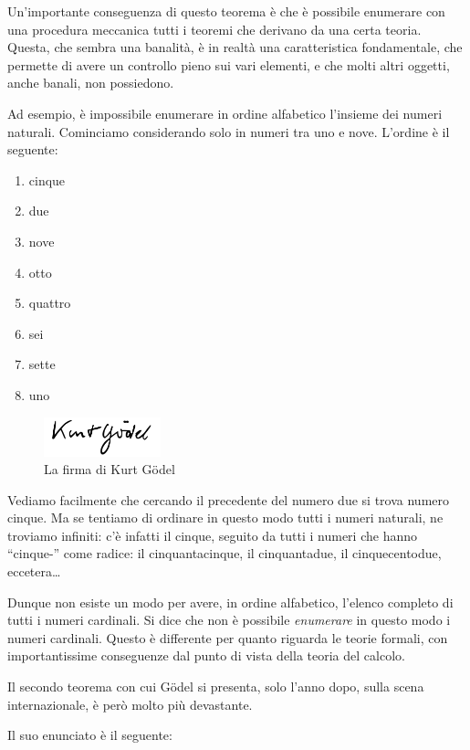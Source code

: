 \documentclass[a4paper,10pt]{article}
\begin{document}
Un'importante conseguenza di questo teorema è che è possibile enumerare con una procedura meccanica tutti i teoremi che derivano da una certa teoria.
Questa, che sembra una banalità, è in realtà una caratteristica fondamentale, che permette di avere un controllo pieno sui vari elementi, e che molti altri oggetti, anche banali, non possiedono. \cite{maraschini-palma}

Ad esempio, è impossibile enumerare in ordine alfabetico l'insieme dei numeri naturali.
Cominciamo considerando solo in numeri tra uno e nove. L'ordine è il seguente:
\begin{enumerate}
  \item cinque
  \item due
  \item nove
  \item otto
  \item quattro
  \item sei
  \item sette
  \item uno
\end{enumerate}

\begin{figure}[b!]
 \centering
 \includegraphics[width=128px]{./pics/128px-KG_signature.png}
 \caption{La firma di Kurt Gödel}
\end{figure}

Vediamo facilmente che cercando il precedente del numero due si trova numero cinque. Ma se tentiamo di ordinare in questo modo tutti i numeri naturali, ne troviamo infiniti: c'è infatti il cinque, seguito da tutti i numeri che hanno “cinque-” come radice: il cinquantacinque, il cinquantadue, il cinquecentodue, eccetera\dots

Dunque non esiste un modo per avere, in ordine alfabetico, l'elenco completo di tutti i numeri cardinali. Si dice che non è possibile \textit{enumerare} in questo modo i numeri cardinali. Questo è differente per quanto riguarda le teorie formali, con importantissime conseguenze dal punto di vista della teoria del calcolo.

Il secondo teorema con cui Gödel si presenta, solo l'anno dopo, sulla scena internazionale, è però molto più devastante.

Il suo enunciato è il seguente:
\end{document}
